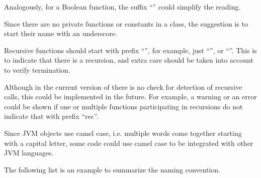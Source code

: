Analogously, for a Boolean function, the suffix ``'' could simplify the reading.

Since there are no private functions or constants in a class, the suggestion is to start their name with an underscore.

Recursive functions should start with prefix ``'', for example, just ``'', or ``''.
This is to indicate that there is a recursion, and extra care should be taken into account to verify termination.

Although in the current version of \Soda there is no check for detection of recursive calls, this could be implemented in the future.
For example, a warning or an error could be shown if one or multiple functions participating in recursions do not indicate that with prefix ``rec''.

Since JVM objects use camel case, i.e. multiple words come together starting with a capital letter,
some \Soda code could use camel case to be integrated with other JVM languages.

The following list is an example to summarize the naming convention.

